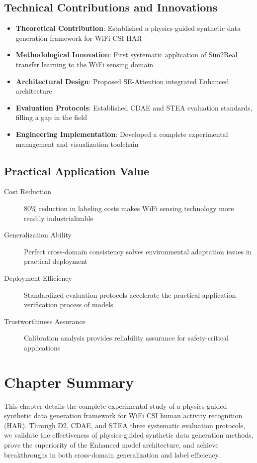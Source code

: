\subsection{Technical Contributions and Innovations}
\label{subsec:technical_contributions}

\begin{itemize}
\item \textbf{Theoretical Contribution}: Established a physics-guided synthetic data generation framework for WiFi CSI HAR
\item \textbf{Methodological Innovation}: First systematic application of Sim2Real transfer learning to the WiFi sensing domain
\item \textbf{Architectural Design}: Proposed SE-Attention integrated Enhanced architecture
\item \textbf{Evaluation Protocols}: Established CDAE and STEA evaluation standards, filling a gap in the field
\item \textbf{Engineering Implementation}: Developed a complete experimental management and visualization toolchain
\end{itemize}

\subsection{Practical Application Value}
\label{subsec:practical_value}

\begin{description}
\item[Cost Reduction] 80\% reduction in labeling costs makes WiFi sensing technology more readily industrializable
\item[Generalization Ability] Perfect cross-domain consistency solves environmental adaptation issues in practical deployment
\item[Deployment Efficiency] Standardized evaluation protocols accelerate the practical application verification process of models
\item[Trustworthiness Assurance] Calibration analysis provides reliability assurance for safety-critical applications
\end{description}

\section{Chapter Summary}
\label{sec:chapter_summary}

This chapter details the complete experimental study of a physics-guided synthetic data generation framework for WiFi CSI human activity recognition (HAR). Through D2, CDAE, and STEA three systematic evaluation protocols, we validate the effectiveness of physics-guided synthetic data generation methods, prove the superiority of the Enhanced model architecture, and achieve breakthroughs in both cross-domain generalization and label efficiency.

